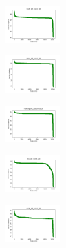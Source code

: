 \begin{figure}[H]
\begin{subfigure}
    \end{subfigure}
    \hfill
    \begin{subfigure}
        \centering
        \includegraphics[width=0.234\textwidth]{img/HS-LS-v2/ecoli_set_const_10_589741062_cost.png}
    \end{subfigure}
    \hfill
    \begin{subfigure}
        \centering
        \includegraphics[width=0.234\textwidth]{img/HS-LS-v2/rand_set_const_10_589741062_cost.png}
    \end{subfigure}
    \hfill
    \begin{subfigure}
        \centering
        \includegraphics[width=0.234\textwidth]{img/HS-LS-v2/newthyroid_set_const_10_589741062_cost.png}
    \end{subfigure}
    \hfill
    \begin{subfigure}
        \centering
        \includegraphics[width=0.234\textwidth]{img/HS-LS-v2/iris_set_const_10_277451237_cost.png}
    \end{subfigure}
    \hfill
    \begin{subfigure}
        \centering
        \includegraphics[width=0.234\textwidth]{img/HS-LS-v2/ecoli_set_const_10_277451237_cost.png}
    \end{subfigure}

\end{figure}
